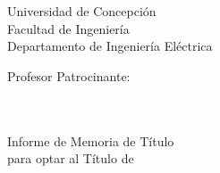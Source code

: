 \begin{titlepage}
\begingroup

\linespread{1}\selectfont
\setlength{\parskip}{0pt}

\begin{minipage}{0.45\textwidth}
	Universidad de Concepción \\ Facultad de Ingeniería \\ Departamento de Ingeniería Eléctrica
\end{minipage}
%
\hfill
%
\begin{minipage}{0.45\textwidth}
	\raggedleft
	Profesor Patrocinante: \\ \AdvisorNameA 
\end{minipage}
%
%
\begin{center} 
	\vspace{5cm}
	
	\textsc{\huge \MainTitle}\\[5.5cm]

	{\large \AuthorName}\\[1.5cm]

	Informe de Memoria de Título\\
	para optar al Título de\\[1.5cm] 

	\CTitle
	\vfill

	\ifdefined\MyCustomDate
		{\large \MyCustomDate}
	\else
		{\large {\monthname} \the\year}
	\fi
\end{center}

\endgroup
\end{titlepage}

